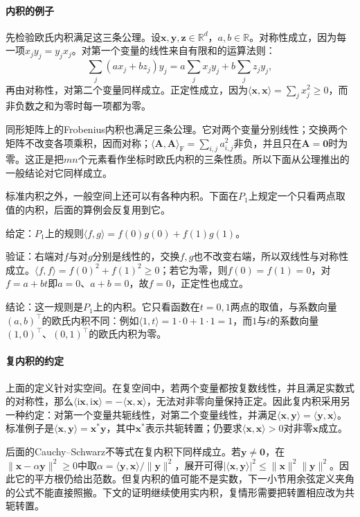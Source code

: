 \paragraph{内积的例子}
先检验欧氏内积满足这三条公理。设$\bm x,\bm y,\bm z\in\mathbb R^d$，$a,b\in\mathbb R$。对称性成立，因为每一项$x_jy_j=y_jx_j$。对第一个变量的线性来自有限和的运算法则：
\[
 \sum_j(ax_j+bz_j)y_j=a\sum_jx_jy_j+b\sum_jz_jy_j,
\]
再由对称性，对第二个变量同样成立。正定性成立，因为$\langle\bm x,\bm x\rangle=\sum_jx_j^2\geq0$，而非负数之和为零时每一项都为零。

同形矩阵上的Frobenius内积也满足三条公理。它对两个变量分别线性；交换两个矩阵不改变各项乘积，因而对称；$\langle\bm A,\bm A\rangle_{\mathrm F}=\sum_{i,j}a_{i,j}^2$非负，并且只在$\bm A=\bm0$时为零。这正是把$mn$个元素看作坐标时欧氏内积的三条性质。所以下面从公理推出的一般结论对它同样成立。

标准内积之外，一般空间上还可以有各种内积。下面在$P_1$上规定一个只看两点取值的内积，后面的算例会反复用到它。
\begin{example}[只看两点取值的内积]
\label{ex:ls-two-point-inner-product}
给定：$P_1$上的规则$\langle f,g\rangle=f(0)g(0)+f(1)g(1)$。

验证：右端对$f$与对$g$分别是线性的，交换$f,g$也不改变右端，所以双线性与对称性成立。$\langle f,f\rangle=f(0)^2+f(1)^2\geq0$；若它为零，则$f(0)=f(1)=0$，对$f=a+bt$即$a=0$、$a+b=0$，故$f=0$，正定性也成立。

结论：这一规则是$P_1$上的内积。它只看函数在$t=0,1$两点的取值，与系数向量$(a,b)^\top$的欧氏内积不同：例如$\langle1,t\rangle=1\cdot0+1\cdot1=1$，而$1$与$t$的系数向量$(1,0)^\top$、$(0,1)^\top$的欧氏内积为零。
\end{example}

\paragraph{复内积的约定}
上面的定义针对实空间。在复空间中，若两个变量都按复数线性，并且满足实数式的对称性，那么$\langle\mathrm i\bm x,\mathrm i\bm x\rangle=-\langle\bm x,\bm x\rangle$，无法对非零向量保持正定。因此复内积采用另一种约定：对第一个变量共轭线性，对第二个变量线性，并满足$\langle\bm x,\bm y\rangle=\overline{\langle\bm y,\bm x\rangle}$。标准例子是$\langle\bm x,\bm y\rangle=\bm x^*\bm y$，其中$\bm x^*$表示共轭转置；仍要求$\langle\bm x,\bm x\rangle>0$对非零$\bm x$成立。

后面的Cauchy--Schwarz不等式在复内积下同样成立。若$\bm y\ne\bm0$，在$\lVert\bm x-\alpha\bm y\rVert^2\geq0$中取$\alpha=\langle\bm y,\bm x\rangle/\lVert\bm y\rVert^2$，展开可得$|\langle\bm x,\bm y\rangle|^2\leq\lVert\bm x\rVert^2\lVert\bm y\rVert^2$。因此它的平方根仍给出范数。但复内积的值可能不是实数，下一小节用余弦定义夹角的公式不能直接照搬。下文的证明继续使用实内积，复情形需要把转置相应改为共轭转置。

